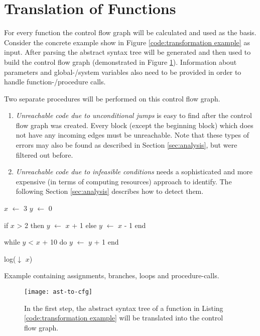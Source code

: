 \pagebreak
\section{Translation of Functions}
\label{sec:translation}
For every function the control flow graph will be calculated and used as the basis. 
Consider the concrete example show in Figure \ref{code:transformation example} as input. 
After parsing the abstract syntax tree will be generated and then used to build the control flow graph (demonstrated in Figure \ref{fig:ast to cfg}).
Information about parameters and global-/system variables also need to be provided in order to handle function-/procedure calls. 

Two separate procedures will be performed on this control flow graph.
\begin{enumerate}
	\item \emph{Unreachable code due to unconditional jumps} is easy to find after the control flow graph was created. Every block (except the beginning block) which does not have any incoming edges must be unreachable.
	Note that these types of errors may also be found as described in Section \ref{sec:analysis}, but were filtered out before.
	\item \emph{Unreachable code due to infeasible conditions} needs a sophisticated and more expensive (in terms of computing resources) approach to identify. The following Section \ref{sec:analysis} describes how to detect them.
\end{enumerate}

\begin{program}[h!]
	\begin{GenericCode}
$x$ $\leftarrow$ 3
$y$ $\leftarrow$ 0
		
if $x$ > 2 then
	$y$ $\leftarrow$ $x$ + 1
else
	$y$ $\leftarrow$ $x$ - 1
end
		
while $y$ < $x$ + 10 do
	$y$ $\leftarrow$ $y$ + 1
end
		
log($\downarrow$ $x$)\end{GenericCode}
	\caption{Example containing assignments, branches, loops and procedure-calls. }
	\label{code:transformation example}
\end{program}

\begin{figure}[h!]
	\centering
	\texttt{[image: ast-to-cfg]}
	\caption{In the first step, the abstract syntax tree of a function in Listing \ref{code:transformation example} will be translated into the control flow graph.}
	\label{fig:ast to cfg}
\end{figure}

